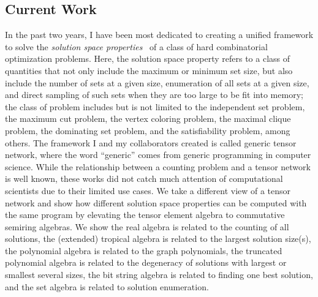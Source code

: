 \documentclass[a4paper]{article}
\newcommand{\<}{\langle}
\renewcommand{\>}{\rangle}
\begin{document}
\subsection{Current Work}
In the past two years, I have been most dedicated to creating a unified framework to solve the \textit{solution space properties}~\cite{Liu2022} of a class of hard combinatorial optimization problems. Here, the solution space property refers to a class of quantities that not only include the maximum or minimum set size, but also include the number of sets at a given size, enumeration of all sets at a given size, and direct sampling of such sets when they are too large to be fit into memory; the class of problem includes but is not limited to the independent set problem, the maximum cut problem, the vertex coloring problem, the maximal clique problem, the dominating set problem, and the satisfiability problem, among others. The framework I and my collaborators created is called generic tensor network, where the word ``generic'' comes from generic programming in computer science.
While the relationship between a counting problem and a tensor network is well known, these works did not catch much attention of computational scientists due to their limited use cases.
We take a different view of a tensor network and show how different solution space properties can be computed with the same program by elevating the tensor element algebra to commutative semiring algebras.
We show the real algebra is related to the counting of all solutions, the (extended) tropical algebra is related to the largest solution size(s), the polynomial algebra is related to the graph polynomials, the truncated polynomial algebra is related to the degeneracy of solutions with largest or smallest several sizes, the bit string algebra is related to finding one best solution, and the set algebra is related to solution enumeration.
\end{document}
